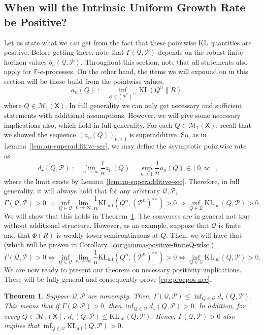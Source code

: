 \documentclass[11pt]{article}
\newcommand{\KL}{\mathrm{KL}}
\newcommand{\KLinf}{\mathrm{KL}_{\mathrm{inf}}}
\newcommand{\Pcal}{\mathcal{P}}
\newcommand{\Qcal}{\mathcal{Q}}
\newcommand{\X}{\mathsf{X}}
\newcommand{\bbF}{\mathbb F}
\newtheorem{theorem}{Theorem}[section]
\theoremstyle{definition}
\theoremstyle{definition}
\begin{document}
\subsection{When will the Intrinsic Uniform Growth Rate be Positive?}
Let us state what we can get from the fact that these pointwise $\KL$ quantities are positive. Before getting there, note that $\Gamma(\Qcal,\Pcal)$ depends on the robust finite-horizon values $b_n(\Qcal,\Pcal)$. Throughout this section, note that all statements also apply for $\bbF$-$e$-processes. On the other hand, the items we will expound on in this section will be those build from the pointwise values,
\[
a_n(Q):=\inf_{R\in(\Pcal^n)^{\circ\circ}}\KL(Q^n\|R),
\]
where $Q\in\mathcal M_1(\X)$. In full generality we can only get necessary and sufficient statements with additional assumptions. However, we will give some necessary implications also, which hold in full generality. For each $Q\in\mathcal M_1(\X)$, recall that we showed the sequence $(a_n(Q))_{n\ge 1}$ is superadditive. So, as in Lemma~\ref{lem:an-superadditive-sec}, we may define the asymptotic pointwise rate as
\[
d_{\star}(Q,\Pcal):=\lim_{n\to\infty}\frac1 n a_n(Q)= \sup_{n\ge 1}\frac1n a_n(Q)\in[0,\infty],
\]
where the limit exists by Lemma~\ref{lem:an-superadditive-sec}. Therefore, in full generality, it will always hold that for any arbitrary $\Qcal,\Pcal$,
\begin{equation}\label{eq:eprocpos-nec}
\boxed{
\Gamma(\Qcal,\Pcal)>0\Longrightarrow  \inf_{Q\in\Qcal} \lim_{n\to\infty}\frac1n \KLinf(Q^n,(\Pcal^n)^{\circ\circ}) > 0 \Longrightarrow  \inf_{Q\in\Qcal} \KLinf(Q,\Pcal) > 0.
}
\end{equation}
We will show that this holds in Theorem~\ref{thm:gamma-positive-necessary}. The converses are in general not true without additional structure. However, as an example, suppose that $\Qcal$ is finite and that $\Phi(R)$ is weakly lower semicontinuous at $Q$. Then, we will have that (which will be proven in Corollary~\ref{cor:gamma-positive-finiteQ-wlsc}),
\begin{equation}\label{eq:necsufeprocpos}
\boxed{
\Gamma(\Qcal,\Pcal)>0\Longleftrightarrow  \inf_{Q\in\Qcal} \lim_{n\to\infty}\frac1n \KLinf(Q^n,(\Pcal^n)^{\circ\circ}) > 0 \Longleftrightarrow  \inf_{Q\in\Qcal} \KLinf(Q,\Pcal) > 0.
}
\end{equation}
We are now ready to present our theorem on necessary positivity implications. These will be fully general and consequently prove \eqref{eq:eprocpos-nec}.

\begin{theorem}\label{thm:gamma-positive-necessary}
Suppose $\Qcal,\Pcal$ are nonempty. Then, $\Gamma(\Qcal,\Pcal)\le \inf_{Q\in\Qcal}d_{\star}(Q,\Pcal)$. This means that if $\Gamma(\Qcal,\Pcal)>0$, then $\inf_{Q\in\Qcal}d_{\star}(Q,\Pcal)>0$.  In addition, for every $Q\in\mathcal M_1(\X)$, $d_{\star}(Q,\Pcal)\le \KLinf(Q,\Pcal)$. Hence, $\Gamma(\Qcal,\Pcal)>0$ also implies that $\inf_{Q\in\Qcal}\KLinf(Q,\Pcal)>0$.
\end{theorem}
\end{document}
